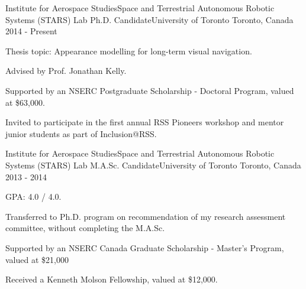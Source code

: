 

\begin{cventries}

  \cventry
    {Institute for Aerospace Studies{\enskip\cdotp\enskip}Space and Terrestrial Autonomous Robotic Systems (STARS) Lab} %
    {Ph.D. Candidate{\enskip\cdotp\enskip}University of Toronto} %
    {Toronto, Canada} %
    {2014 - Present} %
    {
      \begin{cvitems} %
        \item {Thesis topic: Appearance modelling for long-term visual navigation.}
        \item {Advised by Prof. Jonathan Kelly.}
        \item {Supported by an NSERC Postgraduate Scholarship - Doctoral Program, valued at \$63,000.}
        \item {Invited to participate in the first annual RSS Pioneers workshop and mentor junior students as part of Inclusion@RSS.}
      \end{cvitems}
    }

  \cventry
    {Institute for Aerospace Studies{\enskip\cdotp\enskip}Space and Terrestrial Autonomous Robotic Systems (STARS) Lab} %
    {M.A.Sc. Candidate{\enskip\cdotp\enskip}University of Toronto} %
    {Toronto, Canada} %
    {2013 - 2014} %
    {
      \begin{cvitems} %
        \item {GPA: 4.0 / 4.0.}
        \item {Transferred to Ph.D. program on recommendation of my research assessment committee, without completing the M.A.Sc.}
        \item {Supported by an NSERC Canada Graduate Scholarship - Master’s Program, valued at \$21,000} 
        \item {Received a Kenneth Molson Fellowship, valued at \$12,000.}
      \end{cvitems}
    }


\end{cventries}
